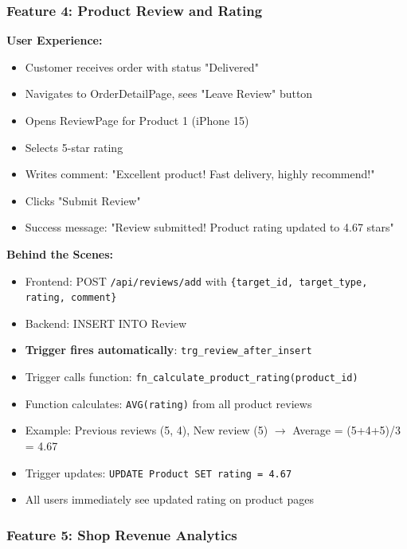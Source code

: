 \subsubsection{Feature 4: Product Review and Rating}

\textbf{User Experience:}
\begin{itemize}
    \item Customer receives order with status "Delivered"
    \item Navigates to OrderDetailPage, sees "Leave Review" button
    \item Opens ReviewPage for Product 1 (iPhone 15)
    \item Selects 5-star rating
    \item Writes comment: "Excellent product! Fast delivery, highly recommend!"
    \item Clicks "Submit Review"
    \item Success message: "Review submitted! Product rating updated to 4.67 stars"
\end{itemize}

\textbf{Behind the Scenes:}
\begin{itemize}
    \item Frontend: POST \texttt{/api/reviews/add} with \texttt{\{target\_id, target\_type, rating, comment\}}
    \item Backend: INSERT INTO Review
    \item \textbf{Trigger fires automatically}: \texttt{trg\_review\_after\_insert}
    \item Trigger calls function: \texttt{fn\_calculate\_product\_rating(product\_id)}
    \item Function calculates: \texttt{AVG(rating)} from all product reviews
    \item Example: Previous reviews (5, 4), New review (5) $\rightarrow$ Average = (5+4+5)/3 = 4.67
    \item Trigger updates: \texttt{UPDATE Product SET rating = 4.67}
    \item All users immediately see updated rating on product pages
\end{itemize}

\subsubsection{Feature 5: Shop Revenue Analytics}

